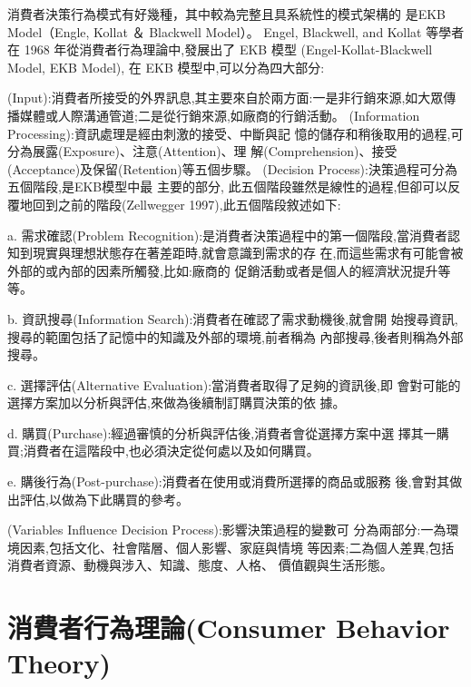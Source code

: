 消費者決策行為模式有好幾種，其中較為完整且具系統性的模式架構的
是EKB Model（Engle, Kollat ＆ Blackwell Model）。
Engel, Blackwell, and Kollat 等學者在 1968 年從消費者行為理論中,發展出了 EKB 模型 (Engel-Kollat-Blackwell Model, EKB Model),
在 EKB 模型中,可以分為四大部分:
\begin{enumerate}
(Input):消費者所接受的外界訊息,其主要來自於兩方面:一是非行銷來源,如大眾傳播媒體或人際溝通管道;二是從行銷來源,如廠商的行銷活動。
(Information Processing):資訊處理是經由刺激的接受、中斷與記
憶的儲存和稍後取用的過程,可分為展露(Exposure)、注意(Attention)、理
解(Comprehension)、接受(Acceptance)及保留(Retention)等五個步驟。
(Decision Process):決策過程可分為五個階段,是EKB模型中最 主要的部分,
此五個階段雖然是線性的過程,但卻可以反覆地回到之前的階段(Zellwegger 1997),此五個階段敘述如下:

a. 需求確認(Problem Recognition):是消費者決策過程中的第一個階段,當消費者認知到現實與理想狀態存在著差距時,就會意識到需求的存 在,而這些需求有可能會被外部的或內部的因素所觸發,比如:廠商的 促銷活動或者是個人的經濟狀況提升等等。

b. 資訊搜尋(Information Search):消費者在確認了需求動機後,就會開 始搜尋資訊,搜尋的範圍包括了記憶中的知識及外部的環境,前者稱為 內部搜尋,後者則稱為外部搜尋。

c. 選擇評估(Alternative Evaluation):當消費者取得了足夠的資訊後,即 會對可能的選擇方案加以分析與評估,來做為後續制訂購買決策的依 據。

d. 購買(Purchase):經過審慎的分析與評估後,消費者會從選擇方案中選 擇其一購買;消費者在這階段中,也必須決定從何處以及如何購買。

e. 購後行為(Post-purchase):消費者在使用或消費所選擇的商品或服務 後,會對其做出評估,以做為下此購買的參考。

(Variables Influence Decision Process):影響決策過程的變數可 分為兩部分:一為環境因素,包括文化、社會階層、個人影響、家庭與情境 等因素;二為個人差異,包括消費者資源、動機與涉入、知識、態度、人格、 價值觀與生活形態。
\end{enumerate}

\section{消費者行為理論(Consumer Behavior Theory)}
